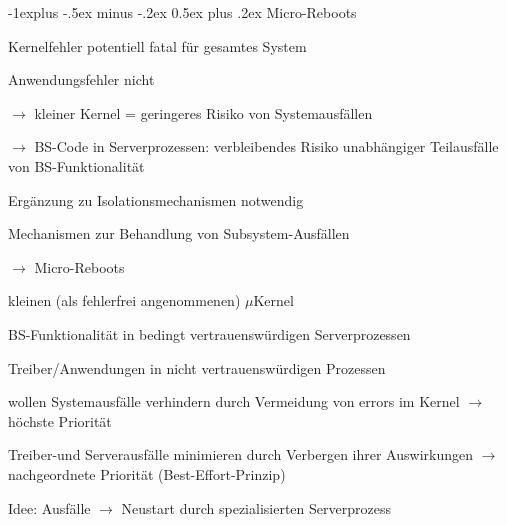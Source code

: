 \documentclass[a4paper]{article}
\makeatletter
\renewcommand{\subsection}{\@startsection{subsection}{2}{0mm}%
 {-1explus -.5ex minus -.2ex}%
 {0.5ex plus .2ex}%
 {\normalfont\normalsize\bfseries}}
\makeatother
\begin{document}
\begin{multicols}{3}
    \subsection{Micro-Reboots}
    \begin{itemize*}
        \item Kernelfehler potentiell fatal für gesamtes System
        \item Anwendungsfehler nicht
        \item[$\rightarrow$] kleiner Kernel = geringeres Risiko von Systemausfällen
        \item[$\rightarrow$] BS-Code in Serverprozessen: verbleibendes Risiko unabhängiger Teilausfälle von BS-Funktionalität
        \item Ergänzung zu Isolationsmechanismen notwendig
        \item Mechanismen zur Behandlung von Subsystem-Ausfällen
        \item[$\rightarrow$] Micro-Reboots
        \item kleinen (als fehlerfrei angenommenen) $\mu$Kernel
        \item BS-Funktionalität in bedingt vertrauenswürdigen Serverprozessen %
        \item Treiber/Anwendungen in nicht vertrauenswürdigen Prozessen %
        \item wollen Systemausfälle verhindern durch Vermeidung von errors im Kernel $\rightarrow$ höchste Priorität
        \item Treiber-und Serverausfälle minimieren durch Verbergen ihrer Auswirkungen $\rightarrow$ nachgeordnete Priorität (Best-Effort-Prinzip)
        \item Idee: Ausfälle $\rightarrow$ Neustart durch spezialisierten Serverprozess
    \end{itemize*}



\end{multicols}
\end{document}
